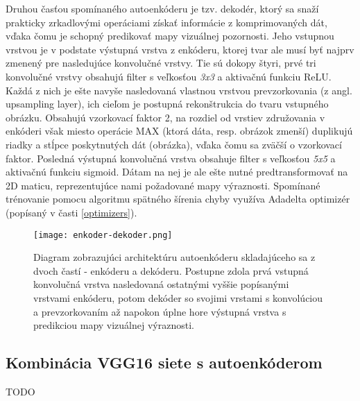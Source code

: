 Druhou časťou spomínaného autoenkóderu je tzv. dekodér, ktorý sa snaží prakticky zrkadlovými operáciami získať informácie z komprimovaných dát, vďaka čomu je schopný predikovať mapy vizuálnej pozornosti. Jeho vstupnou vrstvou je v podstate výstupná vrstva z enkóderu, ktorej tvar ale musí byť najprv zmenený pre nasledujúce konvolučné vrstvy. Tie sú dokopy štyri, prvé tri konvolučné vrstvy obsahujú filter s veľkosťou \textit{3x3} a aktivačnú funkciu ReLU. Každá z nich je ešte navyše nasledovaná vlastnou vrstvou
prevzorkovania (z angl. upsampling layer), ich cieľom je postupná rekonštrukcia do tvaru vstupného obrázku. Obsahujú vzorkovací faktor 2, na rozdiel od vrstiev združovania v enkóderi však miesto operácie MAX (ktorá dáta, resp. obrázok zmenší) duplikujú riadky a stĺpce poskytnutých dát (obrázka), vďaka čomu sa zväčší o vzorkovací faktor. Posledná výstupná konvolučná vrstva obsahuje filter s veľkosťou \textit{5x5} a aktivačnú funkciu sigmoid. Dátam na nej je ale ešte nutné predtransformovať na 2D maticu, reprezentujúce nami požadované mapy výraznosti. Spomínané trénovanie pomocu algoritmu spätného šírenia chyby využíva Adadelta optimizér (popísaný v časti \ref{optimizers}).

\begin{figure}[H]
	\begin{center}
		\texttt{[image: enkoder-dekoder.png]}
		\caption[Diagram navrhnutého autoenkóderu]{
			Diagram zobrazujúci architektúru autoenkóderu skladajúceho sa z dvoch častí - enkóderu a dekóderu. Postupne zdola prvá vstupná konvolučná vrstva nasledovaná ostatnými vyššie popísanými vrstvami enkóderu, potom dekóder so svojimi vrstami s konvolúciou a prevzorkovaním až napokon úplne hore výstupná vrstva s predikciou mapy vizuálnej výraznosti. 
		}\label{autoencoder_structure}
	\end{center}
\end{figure}

\subsection{Kombinácia VGG16 siete s autoenkóderom}
TODO 

